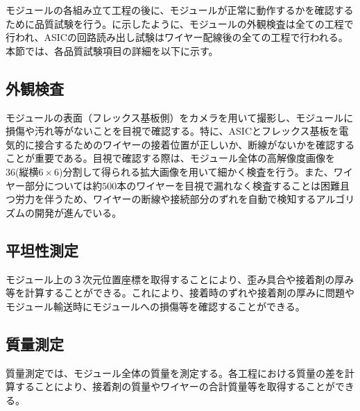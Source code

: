 モジュールの各組み立て工程の後に、モジュールが正常に動作するかを確認するために品質試験を行う。に示したように、モジュールの外観検査は全ての工程で行われ、ASICの回路読み出し試験はワイヤー配線後の全ての工程で行われる。本節では、各品質試験項目の詳細を以下に示す。



\subsection{外観検査}
\label{sec:visualinsp}
モジュールの表面（フレックス基板側）をカメラを用いて撮影し、モジュールに損傷や汚れ等がないことを目視で確認する。特に、ASICとフレックス基板を電気的に接合するためのワイヤーの接着位置が正しいか、断線がないかを確認することが重要である。目視で確認する際は、モジュール全体の高解像度画像を36(縦横$6\times6$)分割して得られる拡大画像を用いて細かく検査を行う。また、ワイヤー部分については約$500$本のワイヤーを目視で漏れなく検査することは困難且つ労力を伴うため、ワイヤーの断線や接続部分のずれを自動で検知するアルゴリズムの開発が進んでいる。



\subsection{平坦性測定}
\label{sec:metrology}
モジュール上の３次元位置座標を取得することにより、歪み具合や接着剤の厚み等を計算することができる。これにより、接着時のずれや接着剤の厚みに問題やモジュール輸送時にモジュールへの損傷等を確認することができる。



\subsection{質量測定}
\label{sec:mass}
質量測定では、モジュール全体の質量を測定する。各工程における質量の差を計算することにより、接着剤の質量やワイヤーの合計質量等を取得することができる。

